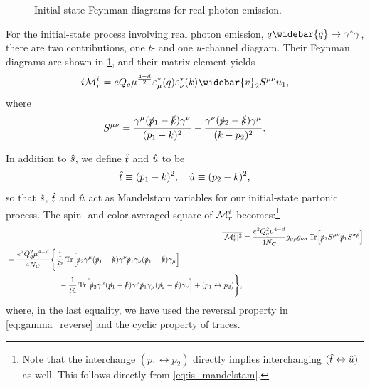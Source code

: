 \begin{figure}
    \centering
    \begin{subfigure}[b]{0.3\linewidth}
        \centering
    \end{subfigure}
    \begin{subfigure}[b]{0.3\linewidth}
        \centering
    \end{subfigure}
    \caption{Initial-state Feynman diagrams for real photon emission.}
    \label{fig:is_emis}
\end{figure}

For the initial-state process involving real photon emission, $q\widebar{q} \to \gamma^*\gamma$, there are two contributions, one $t$- and one $u$-channel diagram. Their Feynman diagrams are shown in \cref{fig:is_emis}, and their matrix element yields
\begin{equation}
    i\M^i_r = eQ_q \mu^{\frac{4-d}{2}} \eps^*_\mu(q) \eps^*_\nu(k) \widebar{v}_2 S^{\mu\nu} u_1,
\end{equation}
where
\begin{equation}
    S^{\mu\nu} = \frac{\gamma^\mu (\slashed{p}{}_1-\slashed{k}) \gamma^\nu}{(p_1-k)^2} - \frac{\gamma^\nu (\slashed{p}{}_2-\slashed{k}) \gamma^\mu}{(k-p_2)^2}.
\end{equation}

In addition to $\hat{s}$, we define $\hat{t}$ and $\hat{u}$ to be
\begin{equation}
    \hat{t} \equiv (p_1-k)^2, \quad \hat{u} \equiv (p_2-k)^2,
    \label{eq:is_mandelstam}
\end{equation}
so that $\hat{s}$, $\hat{t}$ and $\hat{u}$ act as Mandelstam variables for our initial-state partonic process.
The spin- and color-averaged square of $\mathcal{M}^i_r$ becomes:\footnote{Note that the interchange $(p_1 \leftrightarrow p_2)$ directly implies interchanging $(\hat{t} \leftrightarrow \hat{u})$ as well. This follows directly from \cref{eq:is_mandelstam}.}
\begin{align}
    \overline{\lvert\mathcal{M}^i_r\rvert^2} &= \frac{e^2 Q_q^2 \mu^{4-d}}{4N_C} g_{\mu\rho}g_{\nu\sigma}
    \operatorname{Tr}\Bigl[ \slashed{p}{}_2 S^{\mu\nu} \slashed{p}{}_1 S^{\sigma\rho} \Bigr]
    \nonumber \\
    \begin{split}
    &= \frac{e^2 Q_q^2 \mu^{4-d}}{4N_C} \Biggl\{
        \frac{1}{\hat{t}^2} \operatorname{Tr}\Bigl[ \slashed{p}{}_2\gamma^\mu(\slashed{p}{}_1-\slashed{k})\gamma^\nu\slashed{p}{}_1\gamma_\nu(\slashed{p}{}_1-\slashed{k})\gamma_\mu \Bigr]
        \\
        &\hspace{7em} - \frac{1}{\hat{t}\hat{u}} \operatorname{Tr}\Bigl[ \slashed{p}{}_2\gamma^\mu(\slashed{p}{}_1-\slashed{k})\gamma^\nu\slashed{p}{}_1\gamma_\mu(\slashed{p}{}_2-\slashed{k})\gamma_\nu \Bigr]
        + (p_1 \leftrightarrow p_2)
    \Biggr\},
    \label{eq:Mir_bigtrace}
\end{split}
\end{align}
where, in the last equality, we have used the reversal property in \cref{eq:gamma_reverse} and the cyclic property of traces.

